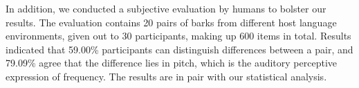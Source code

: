 In addition, we conducted a subjective evaluation by humans to bolster our results. The evaluation contains 20 pairs of barks from different host language environments, given out to 30 participants, making up 600 items in total. Results indicated that 59.00\% participants can distinguish differences between a pair, and 79.09\% agree that the difference lies in pitch, which is the auditory perceptive expression of frequency. The results are in pair with our statistical analysis.




